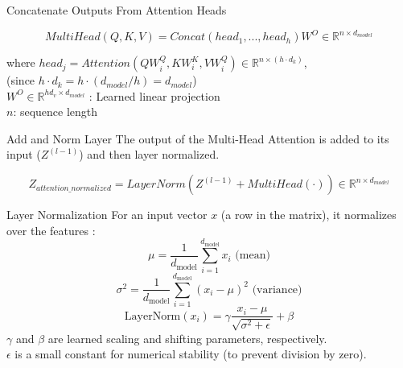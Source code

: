 \documentclass{beamer}
\begin{document}
\begin{frame}{Concatenate Outputs From Attention Heads}

$$MultiHead(Q,K,V) = Concat(head_1, ..., head_h)W^O \in \mathbb{R}^{n \times d_{model}}$$

where $head_j = Attention(QW_i^Q, KW_i^K, VW_i^Q) \in \mathbb{R}^{n \times (h \cdot d_k)}$, \\ 
(since $h \cdot d_k = h \cdot (d_{model}/h) = d_{model}$) \\
$W^O \in \mathbb{R}^{hd_v \times d_{model}}$ : Learned linear projection\\
$n$: sequence length

\end{frame}

\begin{frame}{Add and Norm Layer}
  The output of the Multi-Head Attention is added to its input ($Z^{(l-1)}$) and then layer normalized.

  $$ Z_{attention\_normalized} = LayerNorm(Z^{(l-1)} + MultiHead(\cdot)) \in \mathbb{R}^{n \times d_{model}} $$
\end{frame}


\begin{frame}{Layer Normalization}
  For an input vector $x$ (a row in the matrix), it normalizes over the features \cite{ba2016layer}:
  $$ \mu = \frac{1}{d_{\text{model}}} \sum_{i=1}^{d_{\text{model}}} x_i \text{ (mean)} $$
  $$ \sigma^2 = \frac{1}{d_{\text{model}}} \sum_{i=1}^{d_{\text{model}}} (x_i - \mu)^2 \text{ (variance)} $$
  $$ \text{LayerNorm}(x_i) = \gamma \frac{x_i - \mu}{\sqrt{\sigma^2 + \epsilon}} + \beta $$
   $\gamma$ and $\beta$ are learned scaling and shifting parameters, respectively. \\
   $\epsilon$ is a small constant for numerical stability (to prevent division by zero).
\end{frame}
\end{document}
